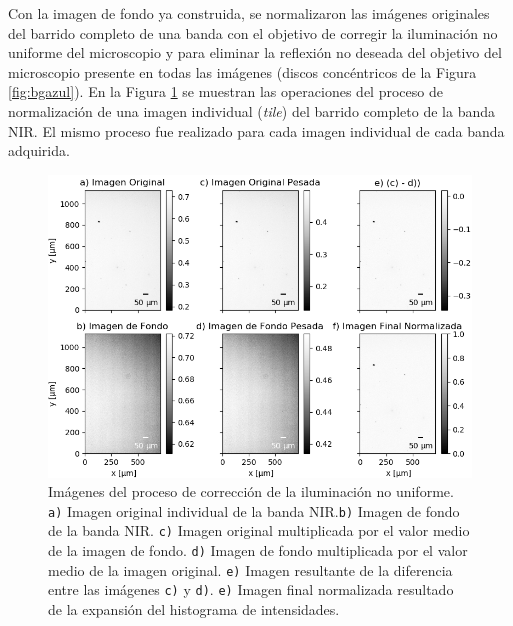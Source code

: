 \hspace{0.5cm} Con la imagen de fondo ya construida, se normalizaron las imágenes originales del barrido completo de una banda\cite{Nordenfelt} con el objetivo de corregir la iluminación no uniforme del microscopio y para eliminar la reflexión no deseada del objetivo del microscopio presente en todas las imágenes (discos concéntricos de la Figura \ref{fig:bgazul}). En la Figura \ref{fig:correcilumims} se muestran las operaciones del proceso de normalización de una imagen individual (\textit{tile}) del barrido completo de la banda NIR. El mismo proceso fue realizado para cada imagen individual de cada banda adquirida.	
\begin{figure}[H]
	\centering
\includegraphics[scale=1.1	]{Figs/defectosZEISS/correccionilum/NIR/1.png}
\caption{Imágenes del proceso de corrección de la iluminación no uniforme. \texttt{a)} Imagen original individual de la banda NIR.\texttt{b)} Imagen de fondo de la banda NIR. \texttt{c)} Imagen original multiplicada por el valor medio de la imagen de fondo. \texttt{d)} Imagen de fondo multiplicada por el valor medio de la imagen original. \texttt{e)} Imagen resultante de la diferencia entre las imágenes \texttt{c)} y \texttt{d)}. \texttt{e)} Imagen final normalizada resultado de la expansión del histograma de intensidades.}
\label{fig:correcilumims}
\end{figure}	

